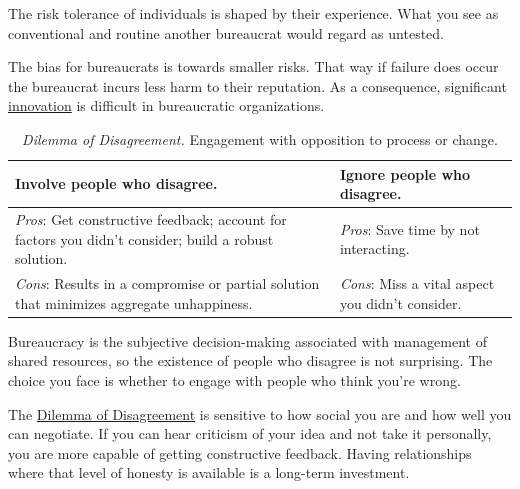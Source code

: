 The risk tolerance of individuals is shaped by their experience. What you see as conventional and routine another bureaucrat would regard as untested. 

The bias for bureaucrats is towards smaller risks. That way if failure does occur the bureaucrat incurs less harm to their reputation. As a consequence, significant 
\hyperref[sec:innovation]{innovation} is difficult in bureaucratic organizations. 


\begin{center}
\begin{table}[H]
\begin{tabular}{ | m{\dilemmatablewidth}| m{\dilemmatablewidth} | } 
  \hline
  \textbf{Involve people who disagree.} & 
  \textbf{Ignore people who disagree.} \\ 
  \hline
  \textit{Pros}: Get constructive feedback; account for factors you didn't consider; build a robust solution. & 
  \textit{Pros}: Save time by not interacting. \\  
  \hline
  \textit{Cons}: Results in a compromise or partial solution that minimizes aggregate unhappiness. & 
  \textit{Cons}: Miss a vital aspect you didn't consider. \\  
  \hline
\end{tabular}
\caption{\textit{Dilemma of Disagreement.}
Engagement with opposition to process or change.
}
\label{table:dilemma-personal-opposition-involve-ignore}
\end{table}
\end{center}



Bureaucracy is the subjective decision-making associated with management of shared resources, so the existence of people who disagree is not surprising. The choice you face is whether to engage with people who think you're wrong. 

The \hyperref[table:dilemma-personal-opposition-involve-ignore]{Dilemma of Disagreement} is sensitive to how social you are and how well you can negotiate. If you can hear criticism of your idea and not take it personally, you are more capable of getting constructive feedback. Having relationships where that level of honesty is available is a long-term investment.

